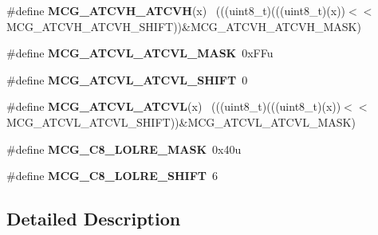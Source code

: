 \begin{DoxyCompactItemize}
\item 
\hypertarget{group___m_c_g___register___masks_gabc2689bb75b7c4cc672293dd43cdcc9d}{}\#define {\bfseries M\+C\+G\+\_\+\+A\+T\+C\+V\+H\+\_\+\+A\+T\+C\+V\+H}(x)                                          ~(((uint8\+\_\+t)(((uint8\+\_\+t)(x))$<$$<$M\+C\+G\+\_\+\+A\+T\+C\+V\+H\+\_\+\+A\+T\+C\+V\+H\+\_\+\+S\+H\+I\+F\+T))\&M\+C\+G\+\_\+\+A\+T\+C\+V\+H\+\_\+\+A\+T\+C\+V\+H\+\_\+\+M\+A\+S\+K)\label{group___m_c_g___register___masks_gabc2689bb75b7c4cc672293dd43cdcc9d}

\item 
\hypertarget{group___m_c_g___register___masks_ga48750526150212b524f731e303a7e3cf}{}\#define {\bfseries M\+C\+G\+\_\+\+A\+T\+C\+V\+L\+\_\+\+A\+T\+C\+V\+L\+\_\+\+M\+A\+S\+K}~0x\+F\+Fu\label{group___m_c_g___register___masks_ga48750526150212b524f731e303a7e3cf}

\item 
\hypertarget{group___m_c_g___register___masks_ga9e3e0eab24aaf1bf2905ae0cf4803eb3}{}\#define {\bfseries M\+C\+G\+\_\+\+A\+T\+C\+V\+L\+\_\+\+A\+T\+C\+V\+L\+\_\+\+S\+H\+I\+F\+T}~0\label{group___m_c_g___register___masks_ga9e3e0eab24aaf1bf2905ae0cf4803eb3}

\item 
\hypertarget{group___m_c_g___register___masks_gac69adca2b6c2222d1f35d7194b82ee41}{}\#define {\bfseries M\+C\+G\+\_\+\+A\+T\+C\+V\+L\+\_\+\+A\+T\+C\+V\+L}(x)                                          ~(((uint8\+\_\+t)(((uint8\+\_\+t)(x))$<$$<$M\+C\+G\+\_\+\+A\+T\+C\+V\+L\+\_\+\+A\+T\+C\+V\+L\+\_\+\+S\+H\+I\+F\+T))\&M\+C\+G\+\_\+\+A\+T\+C\+V\+L\+\_\+\+A\+T\+C\+V\+L\+\_\+\+M\+A\+S\+K)\label{group___m_c_g___register___masks_gac69adca2b6c2222d1f35d7194b82ee41}

\item 
\hypertarget{group___m_c_g___register___masks_gaeab391a933aec2eeb1ffdbc772f714e2}{}\#define {\bfseries M\+C\+G\+\_\+\+C8\+\_\+\+L\+O\+L\+R\+E\+\_\+\+M\+A\+S\+K}~0x40u\label{group___m_c_g___register___masks_gaeab391a933aec2eeb1ffdbc772f714e2}

\item 
\hypertarget{group___m_c_g___register___masks_ga247e347342c951c4b8044bece01311fb}{}\#define {\bfseries M\+C\+G\+\_\+\+C8\+\_\+\+L\+O\+L\+R\+E\+\_\+\+S\+H\+I\+F\+T}~6\label{group___m_c_g___register___masks_ga247e347342c951c4b8044bece01311fb}

\end{DoxyCompactItemize}


\subsection{Detailed Description}
